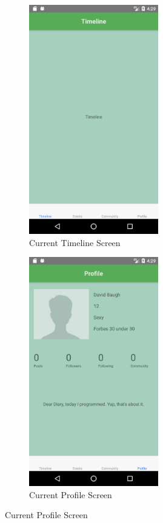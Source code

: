 \documentclass[compsoc, 10, draftclsnofoot, onecolumn]{IEEEtran}
\begin{document}
\begin{figure}[h]
\begin{subfigure}{0.5\textwidth}
\includegraphics[height=10cm]{timeline.png}
  \caption{Current Timeline Screen}	
\end{subfigure}
\begin{subfigure}{0.5\textwidth}
  \includegraphics[height=10cm]{profile.png}
  \caption{Current Profile Screen}
\end{subfigure}
\end{figure}
\FloatBarrier
\end{document}
